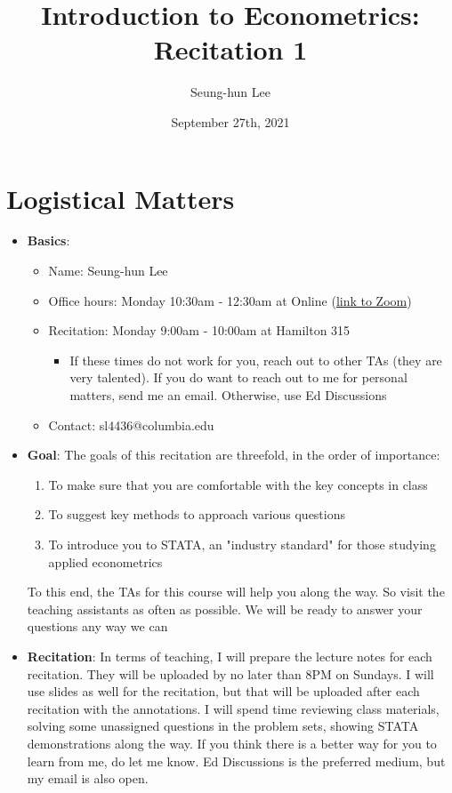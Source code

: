 \documentclass[12pt]{article}
\title{Introduction to Econometrics: Recitation 1}
\theoremstyle{definition}
\theoremstyle{property}
\theoremstyle{assumption}
\theoremstyle{example}
\theoremstyle{comment}
\begin{document}
\linespread{1.25}
\author{Seung-hun Lee}
\date{September 27th, 2021 }
\maketitle
\section{Logistical Matters}
\begin{itemize}
\item \textbf{Basics}: 
\begin{itemize}
\item Name: Seung-hun Lee
\item Office hours: Monday 10:30am - 12:30am at Online (\href{https://columbiauniversity.zoom.us/j/96949225512?pwd=bTgwKytIVHpmNVloU0hNOEFxQ3J3UT09}{link to Zoom})
\item Recitation: Monday 9:00am - 10:00am at Hamilton 315
\begin{itemize}
\item If these times do not work for you, reach out to other TAs (they are very talented). If you do want to reach out to me for personal matters, send me an email. Otherwise, use Ed Discussions
\end{itemize}
\item Contact: sl4436@columbia.edu
\end{itemize}
\item \textbf{Goal}: The goals of this recitation are threefold, in the order of importance:
\begin{enumerate}
\item To make sure that you are comfortable with the key concepts in class
\item To suggest key methods to approach various questions
\item To introduce you to STATA, an "industry standard" for those studying applied econometrics
\end{enumerate}
To this end, the TAs for this course will help you along the way. So visit the teaching assistants as often as possible. We will be ready to answer your questions any way we can
\item \textbf{Recitation}: In terms of teaching, I will prepare the lecture notes for each recitation. They will be uploaded by no later than 8PM on Sundays. I will use slides as well for the recitation, but that will be uploaded after each recitation with the annotations. I will spend time reviewing class materials, solving some unassigned questions in the problem sets, showing STATA demonstrations along the way. If you think there is a better way for you to learn from me, do let me know. Ed Discussions is the preferred medium, but my email is also open.


\end{itemize}
\end{document}
